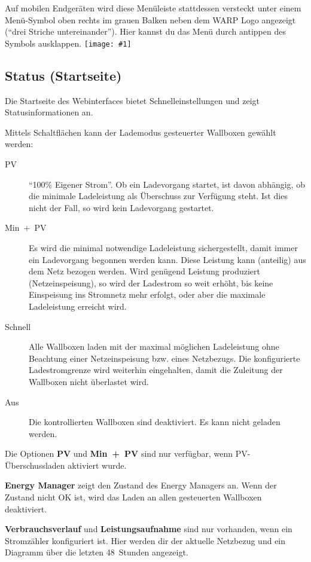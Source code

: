 \documentclass[a4paper,10pt]{article}
\newcommand{\gfx}[1]{\texttt{[image: \#1]}}
\begin{document}
\begin{multicols*}{2}
	Auf mobilen Endgeräten wird
	diese Menüleiste stattdessen versteckt unter einem Menü-Symbol oben rechts
	im grauen Balken neben dem WARP Logo angezeigt (\enquote{drei Striche untereinander}).
	Hier kannst du das Menü durch antippen des Symbols ausklappen.
	\gfx{./img/resized/web_status}

	\vspace{-0.4cm}
	\subsection{Status (Startseite)}
	\label{status}
	Die Startseite des Webinterfaces bietet Schnelleinstellungen und zeigt Statusinformationen an.

	Mittels Schaltflächen kann der Lademodus gesteuerter
	Wallboxen gewählt werden:
	\begin{description}
	\item[PV] \enquote{100\% Eigener Strom}. Ob ein
	Ladevorgang startet, ist davon abhängig, ob die minimale Ladeleistung
	als Überschuss zur Verfügung steht. Ist dies nicht der Fall, so
	wird kein Ladevorgang gestartet.
	\item[Min~+~PV] Es wird die minimal notwendige Ladeleistung sichergestellt, damit immer ein Ladevorgang begonnen werden kann. Diese Leistung kann (anteilig) aus dem Netz bezogen werden. Wird genügend Leistung produziert (Netzeinspeisung), so wird
	der Ladestrom so weit erhöht, bis keine Einspeisung ins Stromnetz mehr
	erfolgt, oder aber die maximale Ladeleistung erreicht wird.
	\item[Schnell] Alle Wallboxen laden mit der maximal möglichen
	Ladeleistung ohne Beachtung einer Netzeinspeisung bzw. eines Netzbezugs. Die konfigurierte Ladestromgrenze wird weiterhin eingehalten, damit die Zuleitung der Wallboxen nicht überlastet wird.
	\item[Aus] Die kontrollierten Wallboxen sind deaktiviert. Es kann
	nicht geladen werden.
	\end{description}
	Die Optionen \textbf{PV} und \textbf{Min~+~PV} sind nur verfügbar, wenn PV-Überschussladen aktiviert wurde.

	\textbf{Energy Manager} zeigt den Zustand des Energy Managers an. Wenn der Zustand nicht OK ist, wird das Laden an allen gesteuerten Wallboxen deaktiviert.

	\textbf{Verbrauchsverlauf} und \textbf{Leistungsaufnahme} sind nur vorhanden, wenn ein Stromzähler konfiguriert ist.
	Hier werden dir der aktuelle Netzbezug und ein Diagramm über
	die letzten 48~Stunden angezeigt.


\end{multicols*}
\end{document}
